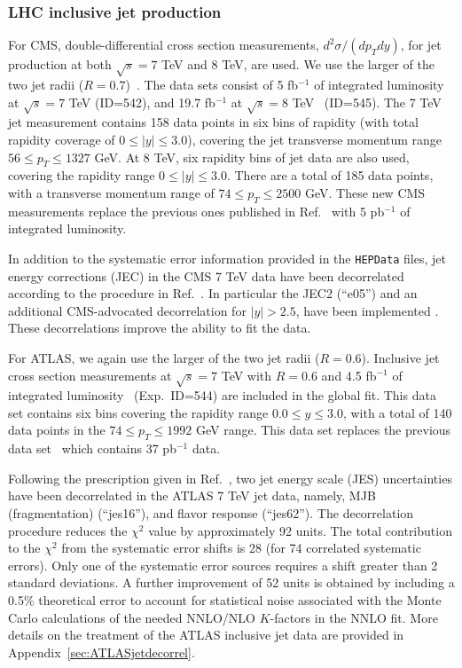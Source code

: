 \subsubsection{LHC inclusive jet production
\label{sec:DataJets}
}
%
For CMS, double-differential cross section measurements, $d^2\sigma /(dp_T dy)$, for jet production at both $\sqrt{s}=7$ TeV and 8 TeV, are used. 
We use the larger of the two jet radii ($R=0.7$)~\cite{Chatrchyan:2014gia}. 
The data sets consist of  5 fb$^{-1}$ of integrated luminosity at $\sqrt{s}=7$ TeV (ID=542), and 19.7 fb$^{-1}$ at $\sqrt{s}=8$ TeV~\cite{Khachatryan:2016mlc} (ID=545). The 7 TeV jet measurement contains 158 data points  in six bins of rapidity (with total rapidity coverage of $0\leq |y|\leq 3.0$),
covering the jet transverse momentum range $56\leq p_T\leq 1327$ GeV. At 8 TeV,  six rapidity bins of jet data are also used, covering the rapidity range $0\leq |y|\leq 3.0$.  There are a total of 185 data points, with a transverse momentum range of  $74\leq p_T\leq 2500$ GeV. 
These new CMS measurements replace the previous ones published in Ref.~\cite{Chatrchyan:2012bja} with 5 pb$^{-1}$ of integrated luminosity.  

In addition to the systematic error information provided in the \texttt{HEPData} files, jet energy corrections (JEC) in the CMS 7 TeV data have been decorrelated  according to the procedure in Ref.~\cite{Khachatryan:2014waa}.  In particular the JEC2 (``e05'') and an additional CMS-advocated decorrelation for $|y|>2.5$, have been implemented \cite{Voutilainen}. These decorrelations  improve the ability to fit the data. 

For ATLAS, we again use the larger of the two jet radii ($R=0.6$). Inclusive jet cross section measurements at $\sqrt{s}=7$ TeV with $R=0.6$ and 4.5 fb$^{-1}$ of integrated luminosity~\cite{Aad:2014vwa}  (Exp.~ID=544) are included in the global fit. 
This data set contains six bins covering the rapidity range $0.0 \leq y \leq 3.0$, with a total of 140 data points in the $74\leq p_T\leq 1992$ GeV range.
This data set replaces the previous data set~\cite{Aad:2011fc} which contains 37 pb$^{-1}$ data. 
 
Following the prescription given in Ref.~\cite{Aaboud:2017dvo}, two jet energy scale (JES) uncertainties have been decorrelated in the ATLAS 7 TeV jet data, namely, MJB (fragmentation) (``jes16''),
and flavor response (``jes62'').
%
The decorrelation procedure reduces the $\chi^2$ value by approximately 92 units. The total contribution to the $\chi^2$ from the systematic error shifts is 28 (for 74 correlated systematic errors).
Only one of the systematic error sources requires a shift greater than 2 standard deviations. A further improvement of 52 units is obtained by including a 0.5\% theoretical error to account for
statistical noise associated with the Monte Carlo calculations of the needed NNLO/NLO $K$-factors \cite{Currie:2016bfm,Currie:2017ctp,Currie:2018xkj} in the NNLO fit.
%
%
More details on the treatment of the ATLAS inclusive jet data are provided in Appendix~\ref{sec:ATLASjetdecorrel}.


